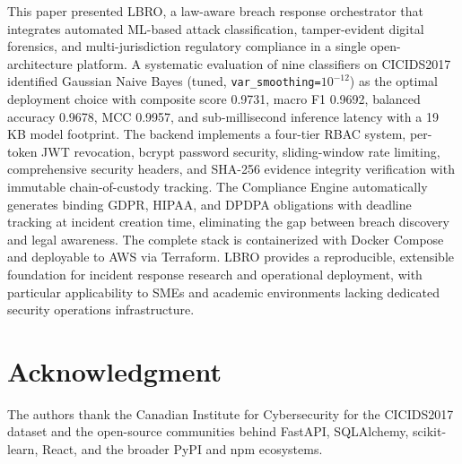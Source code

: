 \documentclass[conference]{IEEEtran}
\begin{document}
This paper presented LBRO, a law-aware breach response orchestrator that integrates automated ML-based attack classification, tamper-evident digital forensics, and multi-jurisdiction regulatory compliance in a single open-architecture platform. A systematic evaluation of nine classifiers on CICIDS2017 identified Gaussian Naive Bayes (tuned, \texttt{var\_smoothing=$10^{-12}$}) as the optimal deployment choice with composite score 0.9731, macro F1 0.9692, balanced accuracy 0.9678, MCC 0.9957, and sub-millisecond inference latency with a 19 KB model footprint. The backend implements a four-tier RBAC system, per-token JWT revocation, bcrypt password security, sliding-window rate limiting, comprehensive security headers, and SHA-256 evidence integrity verification with immutable chain-of-custody tracking. The Compliance Engine automatically generates binding GDPR, HIPAA, and DPDPA obligations with deadline tracking at incident creation time, eliminating the gap between breach discovery and legal awareness. The complete stack is containerized with Docker Compose and deployable to AWS via Terraform. LBRO provides a reproducible, extensible foundation for incident response research and operational deployment, with particular applicability to SMEs and academic environments lacking dedicated security operations infrastructure.

\section*{Acknowledgment}
The authors thank the Canadian Institute for Cybersecurity for the CICIDS2017 dataset and the open-source communities behind FastAPI, SQLAlchemy, scikit-learn, React, and the broader PyPI and npm ecosystems.



\end{document}
